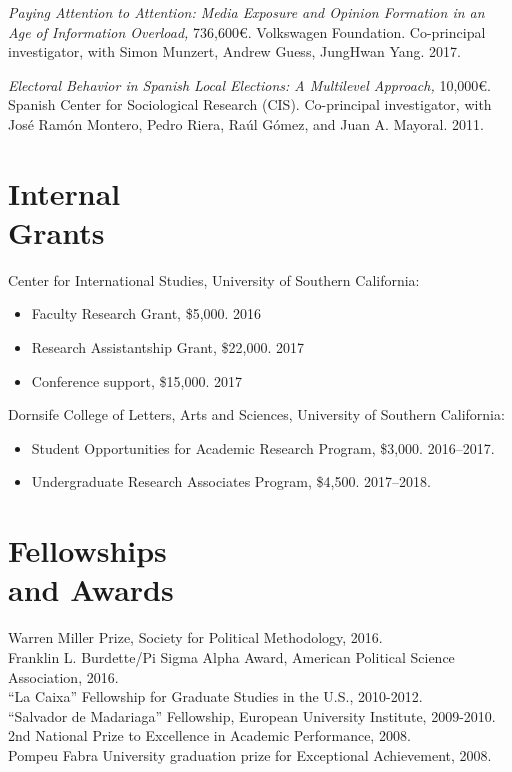\documentclass[margin,line,11pt]{resume}
\newcommand{\nl}{\vspace{0.10in}\\}
\begin{document}
\begin{resume}
\textit{Paying Attention to Attention: Media Exposure and Opinion Formation in an Age of Information Overload,} 736,600\euro. Volkswagen Foundation. Co-principal investigator, with Simon Munzert, Andrew Guess, JungHwan Yang. 2017.

    \textit{Electoral Behavior in Spanish Local Elections: A Multilevel Approach,} 10,000\euro. Spanish Center for Sociological Research (CIS). Co-principal investigator, with Jos\'{e} Ram\'{o}n Montero, Pedro Riera, Ra\'{u}l G\'{o}mez, and Juan A. Mayoral. 2011.    


        \section{\mysidestyle Internal\\Grants}

Center for International Studies, University of Southern California:
\begin{itemize}
\item[] Faculty Research Grant, \$5,000. 2016
\vspace{-.15cm}
\item[] Research Assistantship Grant, \$22,000. 2017
\vspace{-.15cm}
\item[] Conference support, \$15,000. 2017
\end{itemize}
Dornsife College of Letters, Arts and Sciences, University of Southern California:
\begin{itemize}
\item[] Student Opportunities for Academic Research Program, \$3,000. 2016--2017.
\vspace{-.15cm}
\item[] Undergraduate Research Associates Program, \$4,500. 2017--2018.
\end{itemize}
 


    \section{\mysidestyle Fellowships\\ and Awards}
	Warren Miller Prize, Society for Political Methodology, 2016.\nl
    Franklin L. Burdette/Pi Sigma Alpha Award, American Political Science Association, 2016.\nl
	``La Caixa'' Fellowship for Graduate Studies in the U.S., 2010-2012. \nl
	``Salvador de Madariaga'' Fellowship, European University Institute, 2009-2010. \nl
	 2nd National Prize to Excellence in Academic Performance, 2008. \nl
	Pompeu Fabra University graduation prize for Exceptional Achievement, 2008.


\end{resume}
\end{document}
